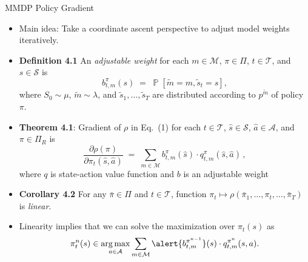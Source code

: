 \begin{block}{MMDP Policy Gradient}

  \begin{itemize}
  \item \alert{Main idea}: Take a coordinate ascent perspective to adjust model weights iteratively.
       \item \textbf{Definition 4.1} An \emph{adjustable weight} for each $m\in \mathcal{M}$, $\pi\in \Pi$, $t\in \mathcal{T}$, and $s \in \mathcal{S}$ is
      \[
       b_{t,m}^{\pi}(s) \; =\;  \mathop{\mathbb{P}}[\tilde{m} = m, \tilde{s}_t= s],
       \]
     where $S_0 \sim \mu$, $\tilde{m} \sim \lambda$, and $\tilde{s}_1, \dots , \tilde{s}_T$ are distributed according to $p^{\tilde{m}}$ of policy $\pi$.
    \vspace{0.2cm}
      \item \textbf{Theorem 4.1}: Gradient of $\rho$ in Eq.~(1) for each $t \in \mathcal{T}$, $\hat{s} \in \mathcal{S}$, $\hat{a} \in \mathcal{A}$, and $\pi \in \Pi_R $ is
     \[
     \frac{\partial \rho(\pi)}{\partial\pi_t(\hat{s},\hat{a})}\; =\;
      \sum_{m \in \mathcal{M}} b_{t,m}^{\pi}(\hat{s})\cdot q_{t,m}^{\pi}(\hat{s},\hat{a})\,,
     \]
     where $q$ is state-action value function and $b$ is an adjustable weight
     \vspace{0.2cm}
     \item \textbf{Corollary 4.2} For any $\bar{\pi} \in \Pi$ and $t\in \mathcal{T}$, function $\pi_t \mapsto \rho(\bar{\pi}_1, \dots , \pi_t, \dots , \bar{\pi}_T)$ is \emph{linear}.  
     \vspace{0.2cm}

    \item Linearity implies that we can solve the maximization over $\pi_t(s)$ as
    \begin{equation*}
 \pi_t^n(s)  \in \argmax_{a \in \mathcal{A}} \sum_{m \in \mathcal{M}} \alert{b_{t,m}^{\pi^{n-1}}}(s)  \cdot q_{t,m}^{\pi^n} (s,a) .
\end{equation*}
  
   \end{itemize}
\end{block}


